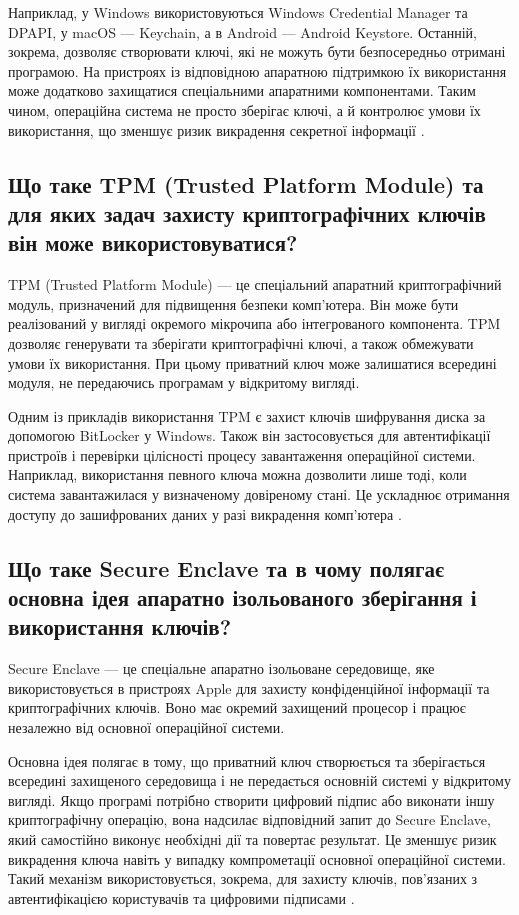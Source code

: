 Наприклад, у Windows використовуються Windows Credential Manager та DPAPI, 
у macOS — Keychain, а в Android — Android Keystore. Останній, зокрема, дозволяє створювати ключі, 
які не можуть бути безпосередньо отримані програмою. На пристроях із відповідною апаратною підтримкою 
їх використання може додатково захищатися спеціальними апаратними компонентами. 
Таким чином, операційна система не просто зберігає ключі, а й контролює умови їх використання, 
що зменшує ризик викрадення секретної інформації \cite{microsoftcred,applekeychain,androidkeystore}.

\subsection{Що таке TPM (Trusted Platform Module) та для яких задач захисту криптографічних ключів він може використовуватися?}

TPM (Trusted Platform Module) — це спеціальний апаратний криптографічний модуль, призначений 
для підвищення безпеки комп'ютера. Він може бути реалізований у вигляді окремого мікрочипа 
або інтегрованого компонента. TPM дозволяє генерувати та зберігати криптографічні ключі, 
а також обмежувати умови їх використання. При цьому приватний ключ може залишатися всередині модуля, 
не передаючись програмам у відкритому вигляді.

Одним із прикладів використання TPM є захист ключів шифрування диска за допомогою BitLocker у Windows. 
Також він застосовується для автентифікації пристроїв і перевірки цілісності процесу завантаження операційної системи. 
Наприклад, використання певного ключа можна дозволити лише тоді, коли система завантажилася у визначеному довіреному стані. 
Це ускладнює отримання доступу до зашифрованих даних у разі викрадення комп'ютера \cite{microsofttpm}.

\subsection{Що таке Secure Enclave та в чому полягає основна ідея апаратно ізольованого зберігання і використання ключів?}

Secure Enclave — це спеціальне апаратно ізольоване середовище, яке використовується в пристроях 
Apple для захисту конфіденційної інформації та криптографічних ключів. Воно має окремий захищений процесор і працює 
незалежно від основної операційної системи.

Основна ідея полягає в тому, що приватний ключ створюється та зберігається всередині захищеного середовища 
і не передається основній системі у відкритому вигляді. Якщо програмі потрібно створити цифровий підпис 
або виконати іншу криптографічну операцію, вона надсилає відповідний запит до Secure Enclave, 
який самостійно виконує необхідні дії та повертає результат. Це зменшує ризик викрадення ключа 
навіть у випадку компрометації основної операційної системи. Такий механізм використовується, зокрема, 
для захисту ключів, пов'язаних з автентифікацією користувачів та цифровими підписами \cite{applesecure}.

